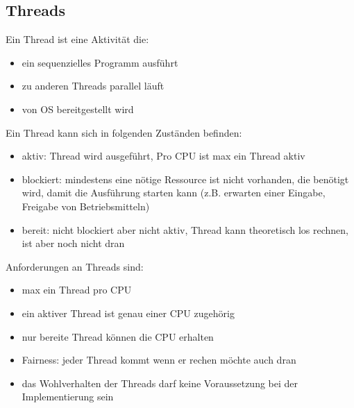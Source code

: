 \documentclass[12pt,a4paper]{article}
\begin{document}
\subsection{Threads}
Ein Thread ist eine Aktivität die:
\begin{itemize}
\item ein sequenzielles Programm ausführt
\item zu anderen Threads parallel läuft
\item von OS bereitgestellt wird
\end{itemize}
Ein Thread kann sich in folgenden Zuständen befinden:
\begin{itemize}
\item aktiv: Thread wird ausgeführt, Pro CPU ist max ein Thread aktiv
\item blockiert: mindestens eine nötige Ressource ist nicht vorhanden, die benötigt wird, damit die Ausführung starten kann (z.B. erwarten einer Eingabe, Freigabe von Betriebsmitteln)
\item bereit: nicht blockiert aber nicht aktiv, Thread kann theoretisch los rechnen, ist aber noch nicht dran
\end{itemize}
Anforderungen an Threads sind: 
\begin{itemize}
\item max ein Thread pro CPU
\item ein aktiver Thread ist genau einer CPU zugehörig
\item nur bereite Thread können die CPU erhalten
\item Fairness: jeder Thread kommt wenn er rechen möchte auch dran
\item das Wohlverhalten der Threads darf keine Voraussetzung bei der Implementierung sein
\end{itemize}
\end{document}
